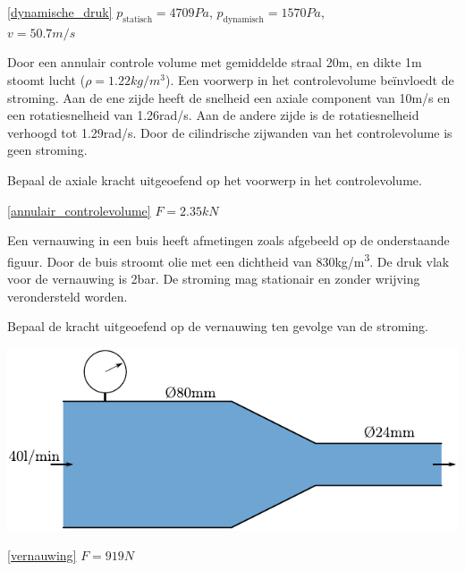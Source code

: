 \begin{antwoord}{\ref{dynamische_druk}}
	$p_{\text{statisch}} = 4709\unit{Pa}$, $p_{\text{dynamisch}} = 1570\unit{Pa}$,\\ $v = 50.7\unit{m/s}$
\end{antwoord}
\begin{toepassing}
	\label{annulair_controlevolume}
Door een annulair controle volume met gemiddelde straal 20m, en dikte 1m stoomt lucht ($\rho=1.22\unit{kg/m^3}$). Een voorwerp in het controlevolume beïnvloedt de stroming. Aan de ene zijde heeft de snelheid een axiale component van 10m/s en een rotatiesnelheid van 1.26rad/s. Aan de andere zijde is de rotatiesnelheid verhoogd tot 1.29rad/s. Door de cilindrische zijwanden van het controlevolume is geen stroming.

Bepaal de axiale kracht uitgeoefend op het voorwerp in het controlevolume.
\end{toepassing}
\begin{antwoord}{\ref{annulair_controlevolume}}
	$F = 2.35\unit{kN}$
\end{antwoord}
\begin{toepassing}
	\label{vernauwing}
Een vernauwing in een buis heeft afmetingen zoals afgebeeld op de onderstaande figuur. Door de buis stroomt olie met een dichtheid van 830\unit{kg/m^3}. De druk vlak voor de vernauwing is 2\unit{bar}. De stroming mag stationair en zonder wrijving verondersteld worden.
		
Bepaal de kracht uitgeoefend op de vernauwing ten gevolge van de stroming.

	\centering
	\includegraphics{fig/behoudsvergelijkingen/vernauwing}
\end{toepassing}
\begin{antwoord}{\ref{vernauwing}}
	$F = 919\unit{N}$
\end{antwoord}
